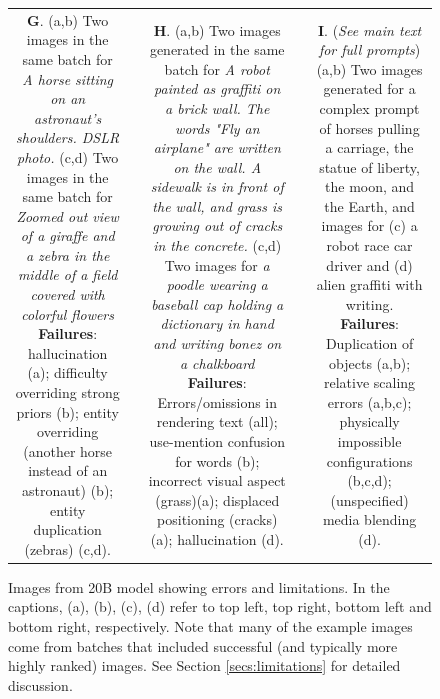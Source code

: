 \begin{figure}
\begin{adjustwidth}{-0.8in}{-0.5in}
\begin{tabular}{cccccccccccccccccccc}
\multicolumn{6}{C{\thirdcolwidth\textwidth}}{\tiny \textbf{G}. (a,b) Two images in the same batch for \textit{A horse sitting on an astronaut's shoulders. DSLR photo.} (c,d) Two images in the same batch for \textit{Zoomed out view of a giraffe and a zebra in the middle of a field covered with colorful flowers} \textbf{Failures}: hallucination (a); difficulty overriding strong priors (b); entity overriding (another horse instead of an astronaut) (b); entity duplication (zebras) (c,d).} && 
\multicolumn{6}{C{\thirdcolwidth\textwidth}}{\tiny \textbf{H}. (a,b) Two images generated in the same batch for \textit{A robot painted as graffiti on a brick wall. The words "Fly an airplane" are written on the wall. A sidewalk is in front of the wall, and grass is growing out of cracks in the concrete.} (c,d) Two images for \textit{a poodle wearing a baseball cap holding a dictionary in hand and writing bonez on a chalkboard} \textbf{Failures}: Errors/omissions in rendering text (all); use-mention confusion for words (b); incorrect visual aspect (grass)(a); displaced positioning (cracks) (a); hallucination (d).} && 
\multicolumn{6}{C{\thirdcolwidth\textwidth}}{\tiny \textbf{I}. (\textit{See main text for full prompts}) (a,b) Two images generated for a complex prompt of horses pulling a carriage, the statue of liberty, the moon, and the Earth, and images for (c) a robot race car driver and (d) alien graffiti with writing. \textbf{Failures}: Duplication of objects (a,b); relative scaling errors (a,b,c); physically impossible configurations (b,c,d); (unspecified) media blending (d).} \\


\end{tabular}
\end{adjustwidth}
\caption{Images from 20B \bdraw model showing errors and limitations. In the captions, (a), (b), (c), (d) refer to top left, top right, bottom left and bottom right, respectively. Note that many of the example images come from batches that included successful (and typically more highly ranked) images. See Section \ref{secs:limitations} for detailed discussion.}
\label{figs:limitations}
\end{figure}
